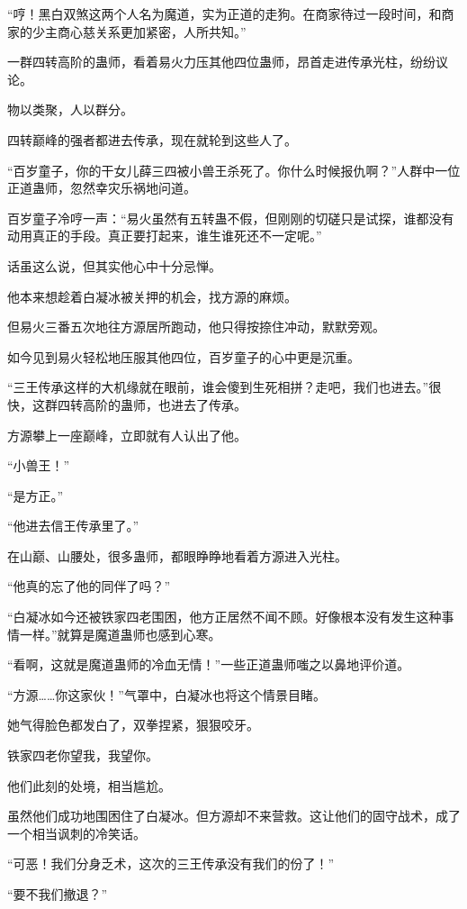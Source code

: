 \begin{this_body}
“哼！黑白双煞这两个人名为魔道，实为正道的走狗。在商家待过一段时间，和商家的少主商心慈关系更加紧密，人所共知。”

一群四转高阶的蛊师，看着易火力压其他四位蛊师，昂首走进传承光柱，纷纷议论。

物以类聚，人以群分。

四转巅峰的强者都进去传承，现在就轮到这些人了。

“百岁童子，你的干女儿薛三四被小兽王杀死了。你什么时候报仇啊？”人群中一位正道蛊师，忽然幸灾乐祸地问道。

百岁童子冷哼一声：“易火虽然有五转蛊不假，但刚刚的切磋只是试探，谁都没有动用真正的手段。真正要打起来，谁生谁死还不一定呢。”

话虽这么说，但其实他心中十分忌惮。

他本来想趁着白凝冰被关押的机会，找方源的麻烦。

但易火三番五次地往方源居所跑动，他只得按捺住冲动，默默旁观。

如今见到易火轻松地压服其他四位，百岁童子的心中更是沉重。

“三王传承这样的大机缘就在眼前，谁会傻到生死相拼？走吧，我们也进去。”很快，这群四转高阶的蛊师，也进去了传承。

方源攀上一座巅峰，立即就有人认出了他。

“小兽王！”

“是方正。”

“他进去信王传承里了。”

在山巅、山腰处，很多蛊师，都眼睁睁地看着方源进入光柱。

“他真的忘了他的同伴了吗？”

“白凝冰如今还被铁家四老围困，他方正居然不闻不顾。好像根本没有发生这种事情一样。”就算是魔道蛊师也感到心寒。

“看啊，这就是魔道蛊师的冷血无情！”一些正道蛊师嗤之以鼻地评价道。

“方源……你这家伙！”气罩中，白凝冰也将这个情景目睹。

她气得脸色都发白了，双拳捏紧，狠狠咬牙。

铁家四老你望我，我望你。

他们此刻的处境，相当尴尬。

虽然他们成功地围困住了白凝冰。但方源却不来营救。这让他们的固守战术，成了一个相当讽刺的冷笑话。

“可恶！我们分身乏术，这次的三王传承没有我们的份了！”

“要不我们撤退？”


\end{this_body}
